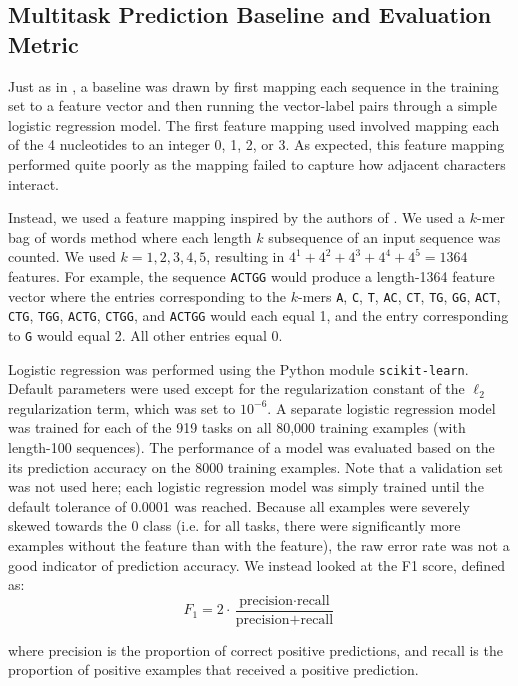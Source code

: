 \documentclass{article} %
\begin{document}
\subsection{Multitask Prediction Baseline and Evaluation Metric}

Just as in \cite{quang2015danq}, a baseline was drawn by first mapping each sequence in the training set to a feature vector and then running the vector-label pairs through a simple logistic regression model. The first feature mapping used involved mapping each of the 4 nucleotides to an integer 0, 1, 2, or 3. As expected, this feature mapping performed quite poorly as the mapping failed to capture how adjacent characters interact.

Instead, we used a feature mapping inspired by the authors of \cite{quang2015danq}. We used a $k$-mer bag of words method where each length $k$ subsequence of an input sequence was counted. We used $k = 1, 2, 3, 4, 5$, resulting in $4^1 + 4^2+4^3+4^4+4^5 = 1364$ features. For example, the sequence \texttt{ACTGG} would produce a length-1364 feature vector where the entries corresponding to the $k$-mers \texttt{A}, \texttt{C}, \texttt{T}, \texttt{AC}, \texttt{CT}, \texttt{TG}, \texttt{GG}, \texttt{ACT}, \texttt{CTG}, \texttt{TGG}, \texttt{ACTG}, \texttt{CTGG}, and \texttt{ACTGG} would each equal 1, and the entry corresponding to \texttt{G} would equal 2. All other entries equal 0.

Logistic regression was performed using the Python module \texttt{scikit-learn}. Default parameters were used except for the regularization constant of the $\ell_2$ regularization term, which was set to $10^{-6}$. A separate logistic regression model was trained for each of the 919 tasks on all 80,000 training examples (with length-100 sequences). The performance of a model was evaluated based on the its prediction accuracy on the 8000 training examples. Note that a validation set was not used here; each logistic regression model was simply trained until the default tolerance of 0.0001 was reached. Because all examples were severely skewed towards the 0 class (i.e. for all tasks, there were significantly more examples without the feature than with the feature), the raw error rate was not a good indicator of prediction accuracy. We instead looked at the F1 score, defined as:
$$ F_1 = 2 \cdot \frac{\mbox{precision} \cdot \mbox{recall} }{\mbox{precision} + \mbox{recall}} $$

where precision is the proportion of correct positive predictions, and recall is the proportion of positive examples that received a positive prediction. 
\end{document}
